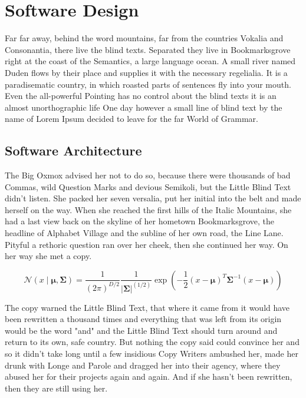 \chapter{Software Design}
\label{chap:typeareatest}

Far far away, behind the word mountains, far from the countries Vokalia and Consonantia, there live the blind texts. Separated they live in Bookmarksgrove right at the coast of the Semantics, a large language ocean. A small river named Duden flows by their place and supplies it with the necessary regelialia. It is a paradisematic country, in which roasted parts of sentences fly into your mouth. Even the all-powerful Pointing has no control about the blind texts it is an almost unorthographic life One day however a small line of blind text by the name of Lorem Ipsum decided to leave for the far World of Grammar. 

\section{Software Architecture}
\label{sec:typeareatest_ombox}

The Big Oxmox advised her not to do so, because there were thousands of bad Commas, wild Question Marks and devious Semikoli, but the Little Blind Text didn’t listen. She packed her seven versalia, put her initial into the belt and made herself on the way. When she reached the first hills of the Italic Mountains, she had a last view back on the skyline of her hometown Bookmarksgrove, the headline of Alphabet Village and the subline of her own road, the Line Lane. Pityful a rethoric question ran over her cheek, then she continued her way. On her way she met a copy.

\begin{equation}
	\mathcal{N}(x \mid \mathbold{\mu}, \mathbold{\Sigma}) = \frac{1}{(2\pi)^{D/2}} \frac{1}{|\mathbold{\Sigma}|^{(1/2)}} \exp \left( -\frac{1}{2}(x-\mathbold{\mu})^{T}\mathbold{\Sigma}^{-1}(x-\mathbold{\mu}) \right)
\end{equation}

The copy warned the Little Blind Text, that where it came from it would have been rewritten a thousand times and everything that was left from its origin would be the word "and" and the Little Blind Text should turn around and return to its own, safe country. But nothing the copy said could convince her and so it didn’t take long until a few insidious Copy Writers ambushed her, made her drunk with Longe and Parole and dragged her into their agency, where they abused her for their projects again and again. And if she hasn’t been rewritten, then they are still using her.

